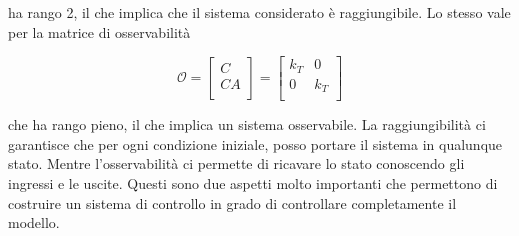 	\noindent ha rango 2, il che implica che il sistema considerato è raggiungibile. Lo stesso vale per la matrice di osservabilità
		
	\begin{equation}
		\mathcal{O}=
		\left[
		\begin{array}{cc}
			C  \\ \hline
			CA \\
		\end{array}
		\right]
		=
		\begin{bmatrix}
			k_T & 0   \\
			0   & k_T \\
		\end{bmatrix}
	\end{equation} 
		
	\noindent che ha rango pieno, il  che implica un sistema osservabile. La raggiungibilità ci garantisce che per ogni condizione iniziale, posso portare il sistema in qualunque stato. Mentre l'osservabilità ci permette di ricavare lo stato conoscendo gli ingressi e le uscite. Questi sono due aspetti molto importanti che permettono di costruire un sistema di controllo in grado di controllare completamente il modello.
	
	